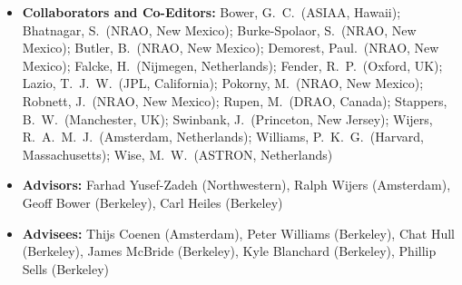 \documentclass[11pt]{article}
\begin{document}
\begin{itemize}
 \item {\bf Collaborators and Co-Editors:}
Bower, G.~C.~(ASIAA, Hawaii);
Bhatnagar, S.~(NRAO, New Mexico);
Burke-Spolaor, S.~(NRAO, New Mexico);
Butler, B.~(NRAO, New Mexico);
Demorest, Paul.~(NRAO, New Mexico);
Falcke, H.~(Nijmegen, Netherlands);
Fender, R.~P.~(Oxford, UK);
Lazio, T.~J.~W.~(JPL, California);
Pokorny, M.~(NRAO, New Mexico);
Robnett, J.~(NRAO, New Mexico);
Rupen, M.~(DRAO, Canada);
Stappers, B.~W.~(Manchester, UK);
Swinbank, J.~(Princeton, New Jersey);
Wijers, R.~A.~M.~J.~(Amsterdam, Netherlands);
Williams, P.~K.~G.~(Harvard, Massachusetts);
Wise, M.~W.~(ASTRON, Netherlands)

 \item {\bf Advisors:} Farhad Yusef-Zadeh (Northwestern), Ralph Wijers (Amsterdam), Geoff Bower (Berkeley), Carl Heiles (Berkeley)

 \item {\bf Advisees:} Thijs Coenen (Amsterdam), Peter Williams (Berkeley), Chat Hull (Berkeley), James McBride (Berkeley), Kyle Blanchard (Berkeley), Phillip Sells (Berkeley)
\end{itemize}

\thispagestyle{empty}
\end{document}
